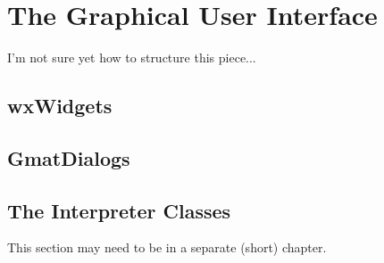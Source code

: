 \chapter{\label{chapter:TheGui}The Graphical User Interface}

I'm not sure yet how to structure this piece...

\section{wxWidgets}

\section{GmatDialogs}

\section{\label{section:InterpreterOverview}The Interpreter Classes}

This section may need to be in a separate (short) chapter.